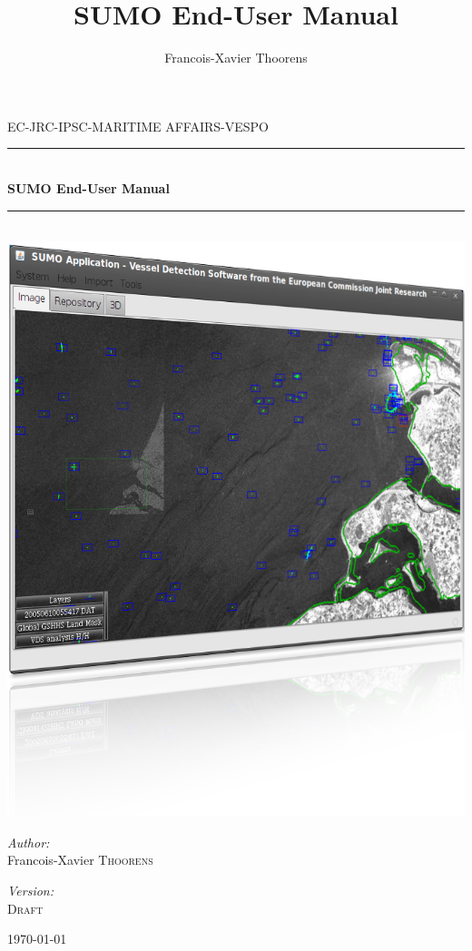 \documentclass[12pt,a4paper,final]{report}
\author{Francois-Xavier Thoorens}
\title{SUMO End-User Manual}
\newcommand{\HRule}{\rule{\linewidth}{0.5mm}}
\begin{document}
\begin{titlepage}
 
\begin{center}
 
 
\textsc{\LARGE EC-JRC-IPSC-MARITIME AFFAIRS-VESPO}\\[1.5cm]
 
\HRule \\[0.4cm]
{\huge \bfseries SUMO End-User Manual}\\[0.4cm]
\HRule \\[1.5cm]
 \includegraphics[scale=0.35,keepaspectratio=true]{./images/SUMO_reflection.png}\\[1cm]
\begin{minipage}{0.4\textwidth}
\begin{flushleft} \large
\emph{Author:}\\
Francois-Xavier \textsc{Thoorens}
\end{flushleft}
\end{minipage}
\begin{minipage}{0.4\textwidth}
\begin{flushright} \large
\emph{Version:} \\
\textsc{Draft}
\end{flushright}
\end{minipage}
 
\vfill

{\large \today}
 
\end{center}
 
\end{titlepage}
\end{document}
